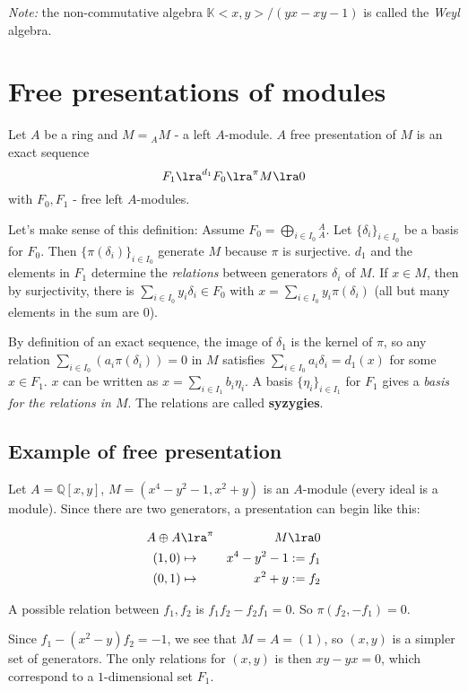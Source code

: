 \textit{Note:} the non-commutative algebra
$\mathbb{K}<x,y>/(yx-xy-1)$ is called the \textit{Weyl} algebra.

\section{Free presentations of modules}
Let $A$ be a ring and $M = {}_AM$ - a left $A$-module.
$A$ free presentation of $M$ is an exact sequence
\begin{equation}\label{eqn:exact-sequence}
F_1 \lra^{d_1} F_0 \lra^{\pi} M \lra 0
\end{equation}
with $F_0, F_1$ - free left $A$-modules.

Let's make sense of this definition:
Assume $F_0 = \bigoplus_{i\in I_0}{}_A^A$.
Let $\{\delta_i\}_{i\in I_0}$ be a basis for $F_0$.
Then $\{\pi(\delta_i)\}_{i\in I_0}$ generate
$M$ because $\pi$ is surjective.
$d_1$ and the elements in $F_1$ determine the 
\textit{relations} between generators $\delta_i$ of $M$.
If $x\in M$, then by surjectivity, there is 
$\sum_{i\in I_0} y_i \delta_i \in F_0$ with
$x = \sum_{i\in I_0} y_i \pi(\delta_i)$
(all but many elements in the sum are $0$).

By definition of an exact sequence, the image of $\delta_1$
is the kernel of $\pi$, so any relation 
$\sum_{i\in I_0} (a_i \pi(\delta_i)) = 0 $ in $M$
satisfies $\sum_{i\in I_0} a_i \delta_i = d_1(x)$
for some $x\in F_1$.
$x$ can be written as $x = \sum_{i\in I_1} b_i \eta_i$.
A basis $\{\eta_i\}_{i\in I_1}$
for $F_1$ gives a \textit{basis for the relations in $M$}.
The relations are called \textbf{syzygies}.

\subsection{Example of free presentation}
Let $A = \mathbb{Q}[x, y]$, $M = (x^4-y^2-1, x^2+y)$
is an $A$-module (every ideal is a module). Since there
are two generators, a presentation can begin like this:

\begin{eqnarray*}
    A \oplus A & \lra^\pi & M \lra 0\\
    (1, 0) & \mapsto & x^4-y^2-1 := f_1\\
    (0, 1) & \mapsto & x^2+y := f_2
\end{eqnarray*}

A possible relation between $f_1, f_2$ is 
$f_1f_2 - f_2f_1=0$. So $\pi(f_2, -f_1) = 0$.

Since $f_1 - (x^2-y)f_2 = -1$, we see that
$M = A = (1)$, so $(x, y)$ is a simpler 
set of generators. The only relations for $(x, y)$
is then $xy-yx=0$, which correspond
to a $1$-dimensional set $F_1$.

